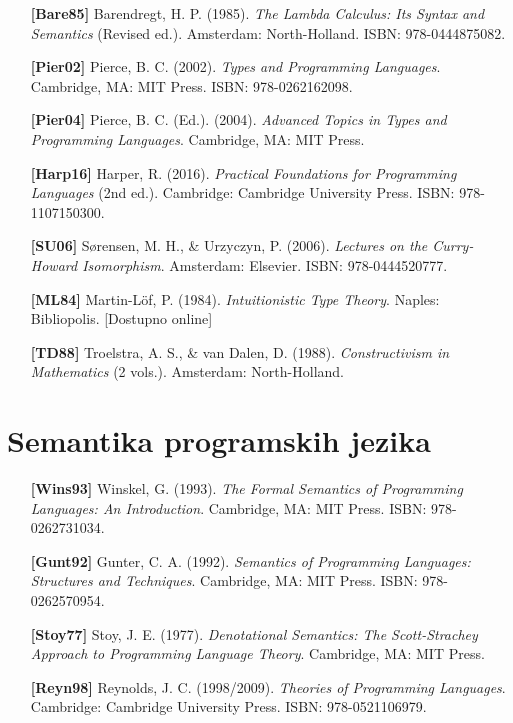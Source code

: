 \begin{itemize}[leftmargin=2cm, labelsep=0.5cm, itemsep=0.3cm]

\item[\textbf{[Bare85]}] Barendregt, H. P. (1985). \textit{The Lambda Calculus: Its Syntax and Semantics} (Revised ed.). Amsterdam: North-Holland. ISBN: 978-0444875082.

\item[\textbf{[Pier02]}] Pierce, B. C. (2002). \textit{Types and Programming Languages}. Cambridge, MA: MIT Press. ISBN: 978-0262162098.

\item[\textbf{[Pier04]}] Pierce, B. C. (Ed.). (2004). \textit{Advanced Topics in Types and Programming Languages}. Cambridge, MA: MIT Press.

\item[\textbf{[Harp16]}] Harper, R. (2016). \textit{Practical Foundations for Programming Languages} (2nd ed.). Cambridge: Cambridge University Press. ISBN: 978-1107150300.

\item[\textbf{[SU06]}] Sørensen, M. H., \& Urzyczyn, P. (2006). \textit{Lectures on the Curry-Howard Isomorphism}. Amsterdam: Elsevier. ISBN: 978-0444520777.

\item[\textbf{[ML84]}] Martin-Löf, P. (1984). \textit{Intuitionistic Type Theory}. Naples: Bibliopolis. [Dostupno online]

\item[\textbf{[TD88]}] Troelstra, A. S., \& van Dalen, D. (1988). \textit{Constructivism in Mathematics} (2 vols.). Amsterdam: North-Holland.

\end{itemize}

\section{Semantika programskih jezika}

\begin{itemize}[leftmargin=2cm, labelsep=0.5cm, itemsep=0.3cm]

\item[\textbf{[Wins93]}] Winskel, G. (1993). \textit{The Formal Semantics of Programming Languages: An Introduction}. Cambridge, MA: MIT Press. ISBN: 978-0262731034.

\item[\textbf{[Gunt92]}] Gunter, C. A. (1992). \textit{Semantics of Programming Languages: Structures and Techniques}. Cambridge, MA: MIT Press. ISBN: 978-0262570954.

\item[\textbf{[Stoy77]}] Stoy, J. E. (1977). \textit{Denotational Semantics: The Scott-Strachey Approach to Programming Language Theory}. Cambridge, MA: MIT Press.

\item[\textbf{[Reyn98]}] Reynolds, J. C. (1998/2009). \textit{Theories of Programming Languages}. Cambridge: Cambridge University Press. ISBN: 978-0521106979.

\end{itemize}

